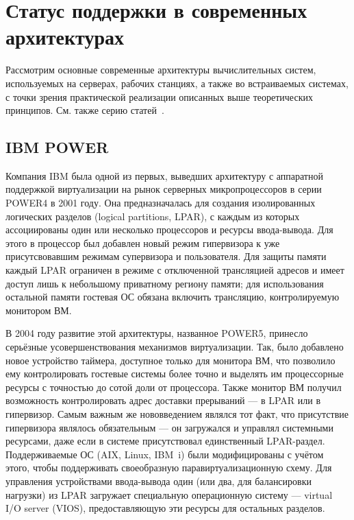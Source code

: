 \section{Статус поддержки в современных архитектурах}

Рассмотрим основные современные архитектуры вычислительных систем, используемых на серверах, рабочих станциях, а также во встраиваемых системах, с точки зрения практической реализации описанных выше теоретических принципов. См. также серию статей~\cite{mpr-03-05-07-01,mpr-03-12-07-01,mpr-03-26-07-01}.

\subsection{IBM POWER}

Компания IBM была одной из первых, выведших архитектуру с аппаратной поддержкой виртуализации на рынок серверных микропроцессоров в серии POWER4 в 2001 году. Она предназначалась для создания изолированных логических разделов (\abbr logical partitions, LPAR), с каждым из которых ассоциированы один или несколько процессоров и ресурсы ввода-вывода. Для этого в процессор был добавлен новый режим гипервизора к уже присутсвовавшим режимам супервизора и пользователя. Для защиты памяти каждый LPAR ограничен в режиме с отключенной трансляцией адресов и имеет доступ лишь к небольшому приватному региону памяти; для использования остальной памяти гостевая ОС обязана включить трансляцию, контролируемую монитором ВМ.

В 2004 году развитие этой архитектуры, названное POWER5, принесло серьёзные усовершенствования механизмов виртуализации. Так, было добавлено новое устройство таймера, доступное только для монитора ВМ, что позволило ему контролировать гостевые системы более точно и выделять им процессорные ресурсы с точностью до сотой доли от процессора. Также монитор ВМ получил возможность контролировать адрес доставки прерываний — в LPAR или в гипервизор. Самым важным же нововведением являлся тот факт, что присутствие гипервизора являлось обязательным — он загружался и управлял системными ресурсами, даже если в системе присутствовал единственный LPAR-раздел. Поддерживаемые ОС (AIX, Linux, IBM~i) были модифицированы с учётом этого, чтобы поддерживать своеобразную паравиртуализационную схему. Для управления устройствами ввода-вывода один (или два, для балансировки нагрузки) из LPAR загружает специальную операционную систему — virtual I/O server (VIOS), предоставляющую эти ресурсы для остальных разделов.

